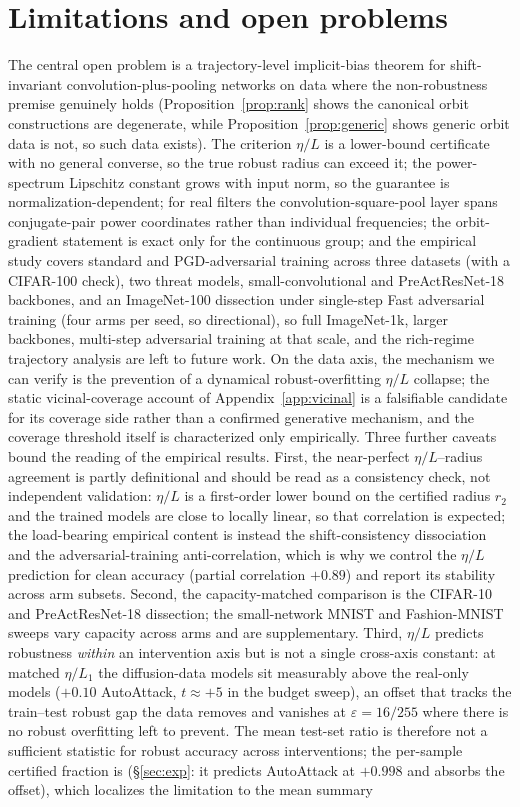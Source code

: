 \documentclass{article}
\theoremstyle{definition}
\begin{document}
\section{Limitations and open problems}
The central open problem is a trajectory-level implicit-bias theorem for shift-invariant convolution-plus-pooling networks on data where the non-robustness premise genuinely holds (Proposition~\ref{prop:rank} shows the canonical orbit constructions are degenerate, while Proposition~\ref{prop:generic} shows generic orbit data is not, so such data exists). The criterion $\eta/L$ is a lower-bound certificate with no general converse, so the true robust radius can exceed it; the power-spectrum Lipschitz constant grows with input norm, so the guarantee is normalization-dependent; for real filters the convolution-square-pool layer spans conjugate-pair power coordinates rather than individual frequencies; the orbit-gradient statement is exact only for the continuous group; and the empirical study covers standard and PGD-adversarial training across three datasets (with a CIFAR-100 check), two threat models, small-convolutional and PreActResNet-18 backbones, and an ImageNet-100 dissection under single-step Fast adversarial training (four arms per seed, so directional), so full ImageNet-1k, larger backbones, multi-step adversarial training at that scale, and the rich-regime trajectory analysis are left to future work. On the data axis, the mechanism we can verify is the prevention of a dynamical robust-overfitting $\eta/L$ collapse; the static vicinal-coverage account of Appendix~\ref{app:vicinal} is a falsifiable candidate for its coverage side rather than a confirmed generative mechanism, and the coverage threshold itself is characterized only empirically. Three further caveats bound the reading of the empirical results. First, the near-perfect $\eta/L$--radius agreement is partly definitional and should be read as a consistency check, not independent validation: $\eta/L$ is a first-order lower bound on the certified radius $r_2$ and the trained models are close to locally linear, so that correlation is expected; the load-bearing empirical content is instead the shift-consistency dissociation and the adversarial-training anti-correlation, which is why we control the $\eta/L$ prediction for clean accuracy (partial correlation $+0.89$) and report its stability across arm subsets. Second, the capacity-matched comparison is the CIFAR-10 and PreActResNet-18 dissection; the small-network MNIST and Fashion-MNIST sweeps vary capacity across arms and are supplementary. Third, $\eta/L$ predicts robustness \emph{within} an intervention axis but is not a single cross-axis constant: at matched $\eta/L_1$ the diffusion-data models sit measurably above the real-only models ($+0.10$ AutoAttack, $t\approx+5$ in the budget sweep), an offset that tracks the train--test robust gap the data removes and vanishes at $\varepsilon=16/255$ where there is no robust overfitting left to prevent. The mean test-set ratio is therefore not a sufficient statistic for robust accuracy across interventions; the per-sample certified fraction is (\S\ref{sec:exp}: it predicts AutoAttack at $+0.998$ and absorbs the offset), which localizes the limitation to the mean summary 
\end{document}
